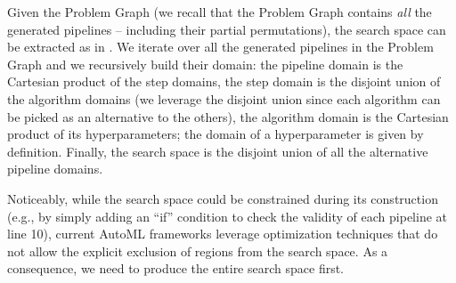 \documentclass[5p,times]{elsarticle}
\begin{document}
Given the Problem Graph (we recall that the Problem Graph contains \emph{all} the generated pipelines -- including their partial permutations), the search space can be extracted as in . 
We iterate over all the generated pipelines in the Problem Graph and we recursively build their domain: the pipeline domain is the Cartesian product of the step domains, the step domain is the disjoint union of the algorithm domains (we leverage the disjoint union since each algorithm can be picked as an alternative to the others), the algorithm domain is the Cartesian product of its hyperparameters; the domain of a hyperparameter is given by definition.
Finally, the search space is the disjoint union of all the alternative pipeline domains.

Noticeably, while the search space could be constrained during its construction (e.g., by simply adding an ``if'' condition to check the validity of each pipeline at  line 10), current AutoML frameworks leverage optimization techniques that do not allow the explicit exclusion of regions from the search space.
As a consequence, we need to produce the entire search space first.
\end{document}
